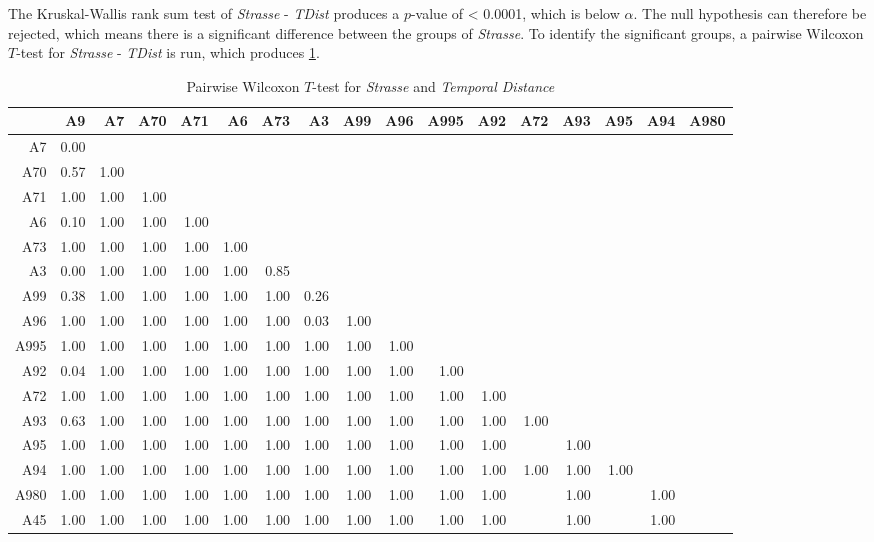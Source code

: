 The Kruskal-Wallis rank sum test of \textit{Strasse} - \textit{TDist} produces a $p$-value of < 0.0001, which is below $\alpha$. The null hypothesis can therefore be rejected, which means there is a significant difference between the groups of \textit{Strasse}. To identify the significant groups, a pairwise Wilcoxon $T$-test for \textit{Strasse} - \textit{TDist} is run, which produces \cref{tbl:wilcoxon_arbis_matched_Strasse_TDist}. 
\begin{table}[ht!]
	\tiny
	\setlength{\tabcolsep}{4pt}
	\centering
  \begin{tabular}{rrrrrrrrrrrrrrrrr}
    \hline
         & A9 & A7 & A70 & A71 & A6 & A73 & A3 & A99 & A96 & A995 & A92 & A72 & A93 & A95 & A94 & A980 \\ 
    \hline
    A7   & 0.00 &  &  &  &  &  &  &  &  &  &  &  &  &  &  &  \\ 
    A70  & 0.57 & 1.00 &  &  &  &  &  &  &  &  &  &  &  &  &  &  \\ 
    A71  & 1.00 & 1.00 & 1.00 &  &  &  &  &  &  &  &  &  &  &  &  &  \\ 
    A6   & 0.10 & 1.00 & 1.00 & 1.00 &  &  &  &  &  &  &  &  &  &  &  &  \\ 
    A73  & 1.00 & 1.00 & 1.00 & 1.00 & 1.00 &  &  &  &  &  &  &  &  &  &  &  \\ 
    A3   & 0.00 & 1.00 & 1.00 & 1.00 & 1.00 & 0.85 &  &  &  &  &  &  &  &  &  &  \\ 
    A99  & 0.38 & 1.00 & 1.00 & 1.00 & 1.00 & 1.00 & 0.26 &  &  &  &  &  &  &  &  &  \\ 
    A96  & 1.00 & 1.00 & 1.00 & 1.00 & 1.00 & 1.00 & 0.03 & 1.00 &  &  &  &  &  &  &  &  \\ 
    A995 & 1.00 & 1.00 & 1.00 & 1.00 & 1.00 & 1.00 & 1.00 & 1.00 & 1.00 &  &  &  &  &  &  &  \\ 
    A92  & 0.04 & 1.00 & 1.00 & 1.00 & 1.00 & 1.00 & 1.00 & 1.00 & 1.00 & 1.00 &  &  &  &  &  &  \\ 
    A72  & 1.00 & 1.00 & 1.00 & 1.00 & 1.00 & 1.00 & 1.00 & 1.00 & 1.00 & 1.00 & 1.00 &  &  &  &  &  \\ 
    A93  & 0.63 & 1.00 & 1.00 & 1.00 & 1.00 & 1.00 & 1.00 & 1.00 & 1.00 & 1.00 & 1.00 & 1.00 &  &  &  &  \\ 
    A95  & 1.00 & 1.00 & 1.00 & 1.00 & 1.00 & 1.00 & 1.00 & 1.00 & 1.00 & 1.00 & 1.00 &  & 1.00 &  &  &  \\ 
    A94  & 1.00 & 1.00 & 1.00 & 1.00 & 1.00 & 1.00 & 1.00 & 1.00 & 1.00 & 1.00 & 1.00 & 1.00 & 1.00 & 1.00 &  &  \\ 
    A980 & 1.00 & 1.00 & 1.00 & 1.00 & 1.00 & 1.00 & 1.00 & 1.00 & 1.00 & 1.00 & 1.00 &  & 1.00 &  & 1.00 &  \\ 
    A45  & 1.00 & 1.00 & 1.00 & 1.00 & 1.00 & 1.00 & 1.00 & 1.00 & 1.00 & 1.00 & 1.00 &  & 1.00 &  & 1.00 &  \\ 
    \hline
  \end{tabular}
	\caption{Pairwise Wilcoxon $T$-test for \textit{Strasse} and \textit{Temporal Distance}}
	\label{tbl:wilcoxon_arbis_matched_Strasse_TDist}
\end{table}
